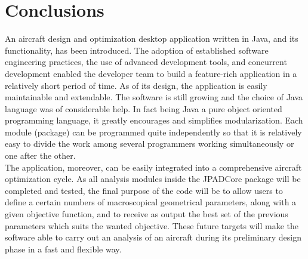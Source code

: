 \chapter*{Conclusions}
An aircraft design and optimization desktop application written in Java, and its functionality, has been introduced. The adoption of established software engineering practices, the use of advanced development tools, and concurrent development enabled the developer team to build a feature-rich application in a relatively short period of time. As of its design, the application is easily maintainable and extendable. The software is still growing and the choice of Java language was of considerable help. In fact being Java a pure object oriented programming language, it greatly encourages and simplifies modularization. Each module (package) can be programmed quite independently so that it is relatively easy to divide the work among several programmers working simultaneously or one after the other.\\
The application, moreover, can be easily integrated into a comprehensive aircraft optimization cycle. As all analysis modules inside the JPADCore package will be completed and tested, the final purpose of the code will be to allow users to define a certain numbers of macroscopical geometrical parameters, along with a given objective function, and to receive as output the best set of the previous parameters which suits the wanted objective. These future targets will make the software able to carry out an analysis of an aircraft during its preliminary design phase in a fast and flexible way.